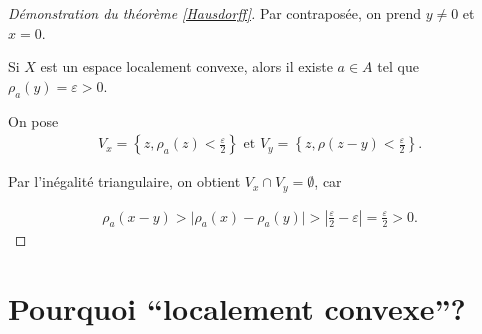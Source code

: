 \documentclass[french]{book}
\theoremstyle{definition}
\theoremstyle{remark}
\newcommand{\lesss}{<}
\newcommand{\less}{\lesss}
\newcommand{\biggg}{>}
\newcommand{\bg}{\biggg}
\begin{document}
\begin{proof}[Démonstration du théorème \ref{Hausdorff}]
  Par contraposée, on prend $y \neq 0$ et $ x = 0$.

  Si $X$ est un espace localement convexe, alors il existe $a \in A$ tel que $\rho_a(y) = \varepsilon \bg 0$.

  On pose
  \begin{gather}
    V_x = \left\{ z, \rho_a(z) \less \frac{\varepsilon }{2} \right\} \text{ et } V_y = \left\{ z, \rho(z-y) \less \frac{\varepsilon }{2} \right\} .
  \end{gather}

  Par l'inégalité triangulaire, on obtient $V_x \cap V_y = \emptyset$, car

  \begin{gather*}
    \rho_a(x-y) \bg \lvert \rho_a(x) - \rho_a(y) \rvert \bg \left\lvert \frac{\varepsilon }{2} - \varepsilon  \right\rvert = \frac{\varepsilon }{2} \bg 0.
  \end{gather*}






\end{proof}

\section{Pourquoi ``localement convexe''?}
\end{document}

